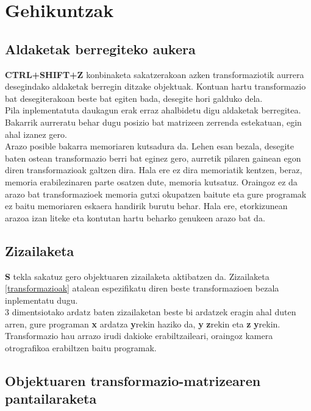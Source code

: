 \documentclass[12pt]{article}
\newcommand{\tekla}[1] {\textbf{#1}}
\begin{document}
\section{Gehikuntzak}

\subsection{Aldaketak berregiteko aukera}

\tekla{CTRL+SHIFT+Z} konbinaketa sakatzerakoan azken transformaziotik aurrera desegindako aldaketak berregin ditzake objektuak. Kontuan hartu transformazio bat desegiterakoan beste bat egiten bada, desegite hori galduko dela.\\
Pila inplementatuta daukagun erak erraz ahalbidetu digu aldaketak berregitea. Bakarrik aurreratu behar dugu posizio bat matrizeen zerrenda estekatuan, egin ahal izanez gero.\\

Arazo posible bakarra memoriaren kutsadura da. Lehen esan bezala, desegite baten ostean transformazio berri bat eginez gero, aurretik pilaren gainean egon diren transformazioak galtzen dira. Hala ere ez dira memoriatik kentzen, beraz, memoria erabilezinaren parte osatzen dute, memoria kutsatuz. Oraingoz ez da arazo bat transformazioek memoria gutxi okupatzen baitute eta gure programak ez baitu memoriaren eskaera handirik burutu behar. Hala ere, etorkizunean arazoa izan liteke eta kontutan hartu beharko genukeen arazo bat da.


\subsection{Zizailaketa}

\tekla{S} tekla sakatuz gero objektuaren zizailaketa aktibatzen da. Zizailaketa \ref{transformazioak} atalean espezifikatu diren beste transformazioen bezala inplementatu dugu.\\

3 dimentsiotako ardatz baten zizailaketan beste bi ardatzek eragin ahal duten arren, gure programan \textbf{x} ardatza \textbf{y}rekin haziko da, \textbf{y} \textbf{z}rekin eta \textbf{z} \textbf{y}rekin. Transformazio hau arrazo irudi dakioke erabiltzaileari, oraingoz kamera otrografikoa erabiltzen baitu programak.\\


\subsection{Objektuaren transformazio-matrizearen pantailaraketa}
\end{document}
